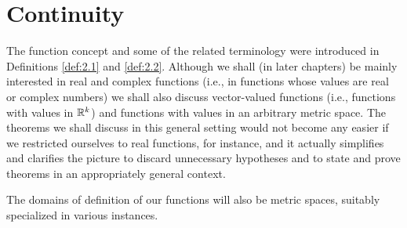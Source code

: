 
\chapter{Continuity}

The function concept and some of the related terminology were introduced in
Definitions \ref{def:2.1} and \ref{def:2.2}. Although we shall (in later chapters) be mainly interested in real and complex functions (i.e., in functions whose values are real or complex numbers) we shall also discuss vector-valued functions (i.e., functions with values in ${\protect\mathbb R}^{k}$) and functions with values in an arbitrary metric space. The theorems we shall discuss in this general setting would not become any easier if we restricted ourselves to real functions, for instance, and it actually simplifies and clarifies the picture to discard unnecessary hypotheses and to state and prove theorems in an appropriately general context. 

The domains of definition of our functions will also be metric spaces, suitably specialized in various instances.







